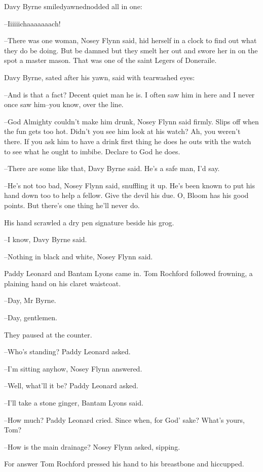 Davy Byrne smiledyawnednodded all in one:

--Iiiiiichaaaaaaach!

--There was one woman,
Nosey Flynn said,
hid herself in a clock to find
out what they do be doing.
But be damned but they smelt her out and swore
her in on the spot a master mason.
That was one of the saint Legers of
Doneraile.

Davy Byrne,
sated after his yawn,
said with tearwashed eyes:

--And is that a fact?
Decent quiet man he is.
I often saw him in here and
I never once saw him--you know,
over the line.

--God Almighty couldn't make him drunk,
Nosey Flynn said firmly.
Slips
off when the fun gets too hot.
Didn't you see him look at his watch?
Ah,
you weren't there.
If you ask him to have a drink first thing he does he
outs with the watch to see what he ought to imbibe.
Declare to God he
does.

--There are some like that,
Davy Byrne said.
He's a safe man,
I'd say.

--He's not too bad,
Nosey Flynn said,
snuffling it up.
He's been known to
put his hand down too to help a fellow.
Give the devil his due.
O,
Bloom
has his good points.
But there's one thing he'll never do.

His hand scrawled a dry pen signature beside his grog.

--I know,
Davy Byrne said.

--Nothing in black and white,
Nosey Flynn said.

Paddy Leonard and Bantam Lyons came in.
Tom Rochford followed frowning,
a
plaining hand on his claret waistcoat.

--Day,
Mr Byrne.

--Day,
gentlemen.

They paused at the counter.

--Who's standing?
Paddy Leonard asked.

--I'm sitting anyhow,
Nosey Flynn answered.

--Well,
what'll it be?
Paddy Leonard asked.

--I'll take a stone ginger,
Bantam Lyons said.

--How much?
Paddy Leonard cried.
Since when,
for God' sake?
What's yours,
Tom?

--How is the main drainage?
Nosey Flynn asked,
sipping.

For answer Tom Rochford pressed his hand to his breastbone and hiccupped.

